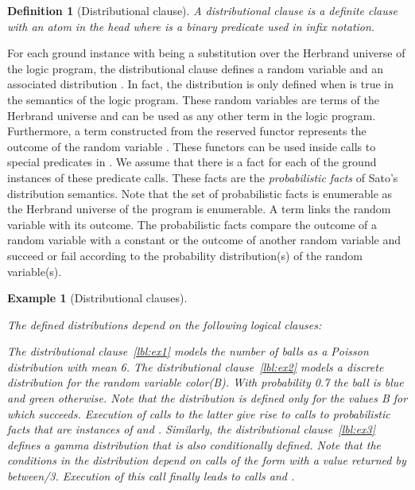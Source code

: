 \documentclass{tlp}
\newtheorem{definition}{Definition}
\newtheorem{example}{Example}
\begin{document}
\begin{definition}[Distributional clause]
  \label{def:disclause}
  A \emph{distributional clause} is a definite clause with an atom
   in the head where  is a binary
  predicate used in infix notation.
\end{definition}

For each ground instance  with  being a substitution
over the Herbrand universe of the logic program, the distributional
clause defines a random variable  and an associated
distribution . In fact, the distribution is only
defined when  is true in the
semantics of the logic program.  These random variables are terms of
the Herbrand universe and can be used as any other term in the logic
program.  Furthermore, a term  constructed from the reserved
functor  represents the outcome of the random variable
. These functors can be used inside calls to special predicates in
.  We assume that there is a fact for each of the ground
instances of these predicate calls. These facts are the
\emph{probabilistic facts} of Sato's distribution semantics. Note that
the set of probabilistic facts is enumerable as the Herbrand universe
of the program is enumerable. A term  links the random
variable  with its outcome. The probabilistic facts compare the
outcome of a random variable with a constant or the outcome of another
random variable and succeed or fail according to the probability
distribution(s) of the random variable(s).


\begin{example}[Distributional clauses]
  \label{ex:probrules}

  

  The defined distributions depend on the following logical clauses:
  

  The distributional clause~\eqref{lbl:ex1} models the number of balls
  as a Poisson distribution with mean 6. The distributional
  clause~\eqref{lbl:ex2} models a discrete distribution for the random
  variable color(B). With probability 0.7 the ball is blue and green
  otherwise. Note that the distribution is defined only for the values
  B for which  succeeds. Execution of
  calls to the latter give rise to calls to probabilistic facts that
  are instances of  and
  .  Similarly, the distributional
  clause~\eqref{lbl:ex3} defines a gamma distribution that is also
  conditionally defined. Note that the conditions in the distribution
  depend on calls of the form 
  with  a value returned by between/3. Execution of this call
  finally leads to calls  and
  .
\end{example} 
\end{document}
